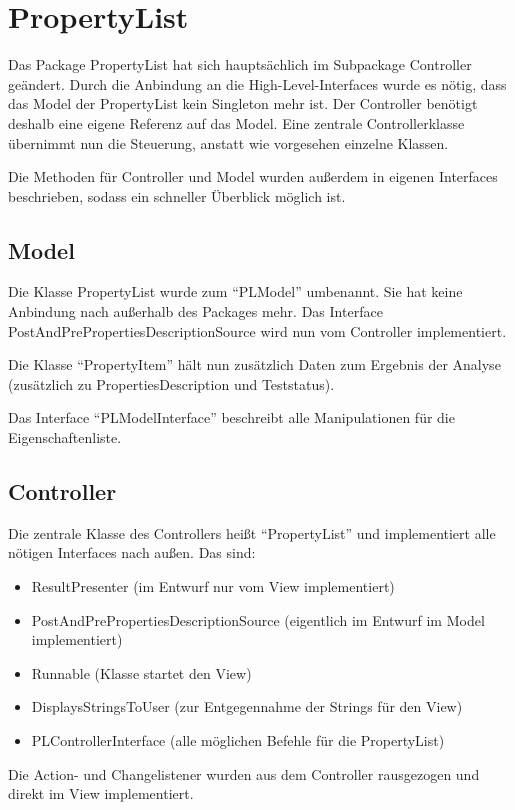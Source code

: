 \documentclass[a4paper]{scrreprt}
\begin{document}
\section{PropertyList}

Das Package PropertyList hat sich hauptsächlich im Subpackage Controller geändert. Durch die Anbindung an die High-Level-Interfaces wurde es nötig, dass das Model der PropertyList kein Singleton mehr ist. Der Controller benötigt deshalb eine eigene Referenz auf das Model. Eine zentrale Controllerklasse übernimmt nun die Steuerung, anstatt wie vorgesehen einzelne Klassen.

Die Methoden für Controller und Model wurden außerdem in eigenen Interfaces beschrieben, sodass ein schneller Überblick möglich ist.

\subsection{Model}
Die Klasse PropertyList wurde zum "`PLModel"' umbenannt. Sie hat keine Anbindung nach außerhalb des Packages mehr. Das Interface PostAndPrePropertiesDescriptionSource wird nun vom Controller implementiert.

Die Klasse "`PropertyItem"' hält nun zusätzlich Daten zum Ergebnis der Analyse (zusätzlich zu PropertiesDescription und Teststatus).

Das Interface "`PLModelInterface"' beschreibt alle Manipulationen für die Eigenschaftenliste.

\subsection{Controller}
Die zentrale Klasse des Controllers heißt "`PropertyList"' und implementiert alle nötigen Interfaces nach außen. Das sind:
\begin{itemize}
	\item ResultPresenter (im Entwurf nur vom View implementiert)
	\item PostAndPrePropertiesDescriptionSource (eigentlich im Entwurf im Model implementiert)
	\item Runnable (Klasse startet den View)
	\item DisplaysStringsToUser (zur Entgegennahme der Strings für den View)
	\item PLControllerInterface (alle möglichen Befehle für die PropertyList)
\end{itemize}
Die Action- und Changelistener wurden aus dem Controller rausgezogen und direkt im View implementiert.
\end{document}
